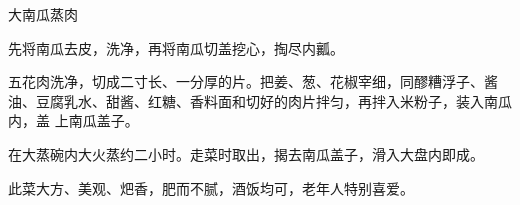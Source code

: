 %
%
%
%
%
%
%
\begin{recipe}[一品南瓜蒸肉]{大南瓜蒸肉}

\ingredients


\preparation

\step 先将南瓜去皮，洗净，再将南瓜切盖挖心，掏尽内瓤。

\step 五花肉洗净，切成二寸长、一分厚的片。把姜、葱、花椒宰细，同醪糟浮子、酱
油、豆腐乳水、甜酱、红糖、香料面和切好的肉片拌匀，再拌入米粉子，装入南瓜内，盖
上南瓜盖子。

\step 在大蒸碗内大火蒸约二小时。走菜时取出，揭去南瓜盖子，滑入大盘内即成。

\features

此菜大方、美观、𤆵香，肥而不腻，酒饭均可，老年人特别喜爱。

\end{recipe}

